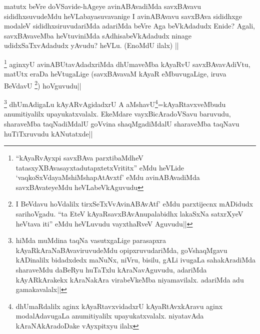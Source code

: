 \begin{artha}
matutx beVre doVSavide-hAgeye avinABAvadiMda savxBAvavu sididhxsuvudeMdu heVLabayasuvavanige I avinABAvavu savxBAva sididhxge modaleV sididhxsiruvudariMda adariMda beVre Aga beVkAdadudx Enide? Agali, savxBAvaveMba heVtuviniMda sAdhisabeVkAdadudx ninage udidxSaTxvAdadudx yAvudu? heVLu. (EnoMdU ilalx) || 
\end{artha}


\begin{artha}
\footnote[1]{``kAyaRvAyxpi savxBAva parxtibaMdheV tatasxyXBAvasayxtadutapxtetxVrititx'' eMdu heVLide `vaqkoSxVdayaMshiMshapAtAvxtf' eMdu avinABAvadiMda savxBAvateyeMdu heVLabeVkAguvudu}
aginxyU avinABUtavAdadxriMda dhUmaveMba kAyaRvU savxBAvavAdiVtu, matUtx eraDa heVtugaLige (savxBAvavaM kAyaR eMbuvugaLige, iruva BeVdavU \footnote[2]{I BeVdavu hoVdalilx tirxSeTxVvAvinABAvAtf' eMdu parxtijecnx mADidudx sarihoVgadu. ``ta EteV kAyaRsavxBAvAnupalabidhx lakaSxNa satxrXyeV heVtava iti'' eMdu heVLuvudu vayxthaRveV Aguvudu||}) hoVguvudu||
\end{artha}


\begin{artha}
\footnote[4]{hiMda muMdina taqNa vasutxgaLige parasapxra kAyaRkAraNaBAvaviruvudeMdu opipxruvudariMda, goVshaqMgavu kADinalilx bidadxdedx maNuNx, niVru, bisilu, gALi ivugaLa sahakAradiMda sharaveMdu daBeRyu huTaTxlu kAraNavAguvudu, adariMda kAyARkArakekx kAraNakAra virabeVkeMba niyamavilalx. adariMda adu gamakavalalx||}
dhUmAdigaLu kAyARvAgidadxrU A aMshavU\footnote[3]{dhUmaRdalilx aginx kAyaRtavxvidadxrU kAyaRtAvxkAravu aginx modalAdavugaLa anumitiyalilx upayukatxvalalx. niyatavAda kAraNAkAradoDake vAyxpitxyu ilalx}=kAyaRtavxveMbudu anumitiyalilx upayukatxvalalx. EkeMdare vayxBicAradoVSavu baruvudu, sharaveMba taqNadiMdalU goVvina shaqMgadiMdalU sharaveMba taqNavu huTiTxruvudu kANutatxde||
\end{artha}
